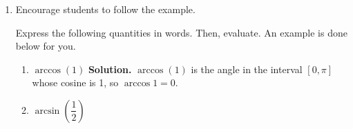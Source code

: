 \documentclass{article}
\begin{document}
\begin{enumerate}
\begin{enumerate}
    \item 
    \begin{workshop}
        It might help to point out to students how the domains and ranges they identify in Question 1 should agree with the inputs and outputs on the above graphs, as a check for consistency.
    \end{workshop}
    Label each graph above as either $\arcsin x$, $\arccos x$, or $\arctan x$. (Are the domains and ranges you listed in \#1 consistent with your choice for each graph above?)
    \item On each graph, label the points $(x,y)$ whose $x$- coordinates are $x=0$, $x=1$, and $x=-1$.
    \begin{workshop}
        Students may not have seen these limits before, but they should be able to read them off of the graph. These are handy limits to have in the back of your mind in future problems or courses!
    \end{workshop}
    \item Label the horizontal asymptotes of $\arctan x$, then compute the following limits.
    \begin{enumerate}
    \end{enumerate}
\end{enumerate}
\newpage
\item 
\begin{workshop}
   Encourage students to follow the example.
\end{workshop}
Express the following quantities in words. Then, evaluate. An example is done below for you.
\begin{enumerate}
   
    
        
    \item $\arccos (1)$ \hspace{0.6cm}\textbf{Solution.} $\arccos (1)$ is the angle in the interval $[0, \pi]$ whose cosine is 1, so $\arccos 1 = 0$.
    \vfill\vfill
    \item $\arcsin \left(\dfrac{1}{2}\right)$
    

\end{enumerate}
\end{enumerate}
\end{document}
